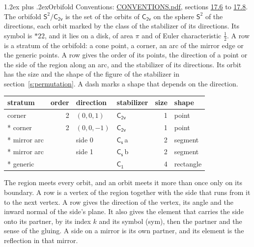 \documentclass[10pt,a4paper]{article}
\makeatletter
\renewcommand\section{\@startsection{section}{1}{\z@}{-3ex plus -1ex minus -.2ex}%
  {1.2ex plus .2ex}{\normalfont\large\sffamily\bfseries\color{parttitle}}}
\numberwithin{equation}{section}
\newcommand{\grp}[1]{\mathsf{#1}}
\newcommand{\orbname}[1]{#1}
\newcommand{\clsletter}[1]{\,{\scriptsize\color{black!55}#1}}
\newcommand{\dirvec}[3]{(#1, #2, #3)}
\newcommand{\twosphere}{\mathsf{S}^{2}}
\makeatother
\begin{document}
\section{Orbifold}\label{s:orbifold}
Conventions: \href{../../CONVENTIONS.pdf}{CONVENTIONS.pdf}, sections \href{../../CONVENTIONS.pdf\#conv.17.6}{17.6} to \href{../../CONVENTIONS.pdf\#conv.17.8}{17.8}.
The orbifold $\twosphere/\grp{C_{2v}}$ is the set of the orbits of $\grp{C_{2v}}$ on the sphere $\twosphere$ of the directions, each orbit marked by the class of the stabilizer of its directions. Its symbol is $\orbname{{\ast}22}$, and it lies on a disk, of area $\pi$ and of Euler characteristic $\tfrac{1}{2}$.
\leavevmode\label{n:head.stratum}\label{n:head.order.point}\label{n:head.direction}\label{n:head.stabilizer}\label{n:head.size.orbit}\label{n:head.shape}A row is a stratum of the orbifold: a cone point, a corner, an arc of the mirror edge or the generic points. A row gives the order of its points, the direction of a point or the side of the region along an arc, and the stabilizer of its directions. Its orbit has the size and the shape of the figure of the stabilizer in section~\ref{s:permutation}. A dash marks a shape that depends on the direction.
{\small\setlength{\tabcolsep}{4pt}\begin{longtable}{@{}lrllrl@{}}\toprule
stratum & order & direction & stabilizer & size & shape\\\midrule\endhead
\bottomrule\endfoot\endlastfoot
corner & 2 & $\dirvec{0}{0}{1}$ & \href{C2v.pdf}{$\grp{C_{2v}}$} & 1 & point\\*
corner & 2 & $\dirvec{0}{0}{-1}$ & \href{C2v.pdf}{$\grp{C_{2v}}$} & 1 & point\\*
mirror arc &  & side 0 & \href{C1v.pdf}{$\grp{C_{s}}$}\clsletter{a} & 2 & segment\\*
mirror arc &  & side 1 & \href{C1v.pdf}{$\grp{C_{s}}$}\clsletter{b} & 2 & segment\\*
generic &  &  & \href{C1.pdf}{$\grp{C_{1}}$} & 4 & rectangle\\
\bottomrule\end{longtable}}
\leavevmode\label{n:head.vertex.region}\label{n:head.angle}\label{n:head.normal.side}\label{n:head.partner}\label{n:head.sense}The region meets every orbit, and an orbit meets it more than once only on its boundary. A row is a vertex of the region together with the side that runs from it to the next vertex. A row gives the direction of the vertex, its angle and the inward normal of the side's plane. It also gives the element that carries the side onto its partner, by its index $k$ and its symbol (sym), then the partner and the sense of the gluing. A side on a mirror is its own partner, and its element is the reflection in that mirror.
\end{document}
